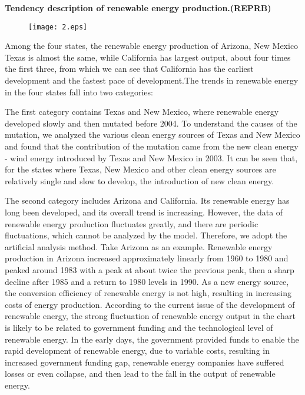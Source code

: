 \begin{itemize}
\textbf{Tendency description of renewable energy production.(REPRB) } 

\begin{figure}[h]

\centering
\texttt{[image: 2.eps]}

\end{figure}



Among the four states, the renewable energy production of Arizona, New Mexico Texas is almost the same, while California has largest output, about four times the first three, from which we can see that California has the earliest development and the fastest pace of development.The trends in renewable energy in the four states fall into two categories:


 The first category contains Texas and New Mexico, where renewable energy developed slowly and then mutated before 2004. To understand the causes of the mutation, we analyzed the various clean energy sources of Texas and New Mexico and found that the contribution of the mutation came from the new clean energy - wind energy introduced by Texas and New Mexico in 2003. It can be seen that, for the states where Texas, New Mexico and other clean energy sources are relatively single and slow to develop, the introduction of new clean energy. 


 The second category includes Arizona and California. Its renewable energy has long been developed, and its overall trend is increasing. However, the data of renewable energy production fluctuates greatly, and there are periodic fluctuations, which cannot be analyzed by the model. Therefore, we adopt the artificial analysis method.
Take Arizona as an example. Renewable energy production in Arizona increased approximately linearly from 1960 to 1980 and peaked around 1983 with a peak at about twice the previous peak, then a sharp decline after 1985 and a return to 1980 levels in 1990. As a new energy source, the conversion efficiency of renewable energy is not high, resulting in increasing costs of energy production. According to the current issue of the development of renewable energy, the strong fluctuation of renewable energy output in the chart is likely to be related to government funding and the technological level of renewable energy. In the early days, the government provided funds to enable the rapid development of renewable energy, due to variable costs, resulting in increased government funding gap, renewable energy companies have suffered losses or even collapse, and then lead to the fall in the output of renewable energy.




\end{itemize}
